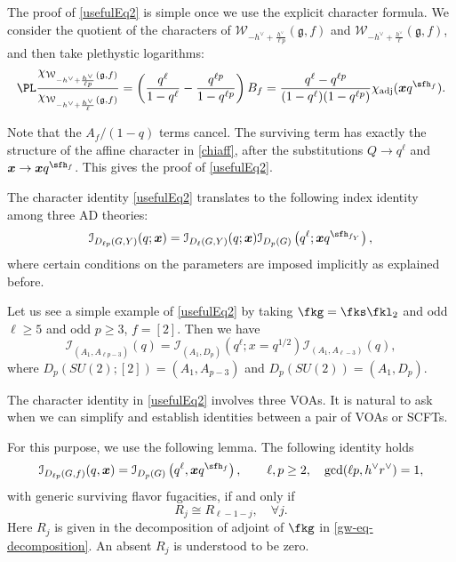 \documentclass[a4paper,11pt]{article}
\theoremstyle{definition}
\theoremstyle{definition}
\theoremstyle{remark}
\newcommand{\be}{\begin{equation}}
\newcommand{\ee}{\end{equation}}
\begin{document}
The proof of \eqref{usefulEq2} is simple once we use the explicit character formula. 
We consider the quotient of the characters of 
$ \mathcal W_{-h^\vee+\frac{h^\vee}{ \ell p }}(\mathfrak g,f) $ and $ \mathcal W_{-h^\vee+\frac{h^\vee}{ \ell   }}(\mathfrak g,f) $, and then take plethystic logarithms: 
\be
\PL\frac{\chi_{\mathcal W_{-h^\vee+\frac{h^\vee}{ \ell p }}(\mathfrak g,f)}}{\chi_{\mathcal W_{-h^\vee+\frac{h^\vee}{ \ell}}(\mathfrak g,f)}}
 =\left(\frac{q^\ell}{1-q^\ell}-\frac{q^{\ell p}}{1-q^{\ell p}}\right)B_f
 =\frac{q^\ell-q^{\ell p}}{(1-q^\ell)(1-q^{\ell p})}
 \chi_{\mathrm{adj}}(\bm x q^{\sfh_f}).
 \label{gw-eq-ratio-proof}
\ee




 
Note that  the $A_f/(1-q)$ terms cancel. The surviving term has exactly the structure of the affine character in \eqref{chiaff}, after   the substitutions $Q\to q^\ell$ and
$\bm x\to \bm x q^{\sfh_f}$.  This gives the proof of \eqref{usefulEq2}.

  
  The character identity \eqref{usefulEq2} translates to the following index identity among three AD theories:    
\be \label{DlpresSU}
\mathcal{I}_{D_{\ell p}(G,Y)}(q; \bm x) 
=  
\mathcal{I}_{D_\ell(G,Y)}(q;\bm{x}) 
\mathcal{I}_{D_p(G)}\left(q^\ell;\bm{x}q^{\sfh_{f_Y}}\right),
\ee
where certain conditions on the parameters are imposed implicitly as explained before. 


Let us see a simple example  of  \eqref{usefulEq2} by taking $\fkg=\fks\fkl_2$ and  odd $\ell\ge5$ and odd $p\ge3$,   $f=[2]$. Then we have
\be 
\mathcal{I}_{(A_1, A_{\ell p-3})}(q) = \mathcal{I}_{(A_1, D_p)} \left(q^\ell; x=q^{1/2}\right) \mathcal{I}_{(A_1, A_{\ell-3})}(q),
\ee  
where $D_{p}(SU(2); [2])  = (A_1, A_{p-3})$ and $D_p(SU(2))  = (A_1,D_p)$.



The character identity  in \eqref{usefulEq2} involves three VOAs. It is natural to ask when we can    simplify and  establish   identities between a pair of VOAs or SCFTs.

For this purpose, we use  the following lemma. 
The following  identity holds
  \be\label{IDgsf}
\mathcal I_{D_{\ell p}(G,f)}(q,\bm x)
=
\mathcal I_{D_p(G)}
\left(q^\ell,\bm xq^{\sfh_f}\right), \qquad \ell,p\ge2,  \quad\gcd(\ell p,h^\vee r^\vee)=1 ,
\ee 
with generic surviving flavor fugacities, if and only if
\be 
R_j\cong R_{\ell-1-j},
\quad \forall j.
\label{Rjref}
\ee
Here $R_j$ is given  in the decomposition of adjoint of $\fkg$ in \eqref{gw-eq-decomposition}. 
An absent $R_j$ is understood to be zero.
\end{document}
